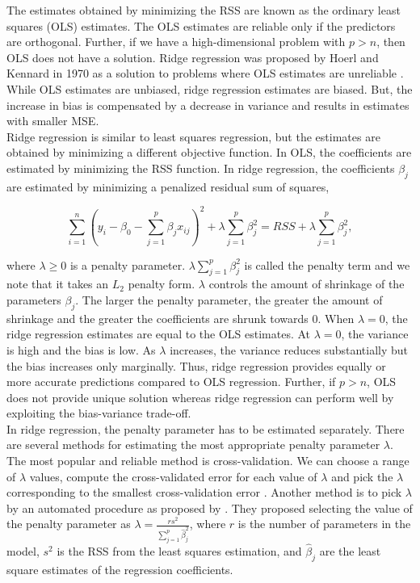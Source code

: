 The estimates obtained by minimizing the RSS are known as the ordinary least squares (OLS) estimates. The OLS estimates are reliable only if the predictors are orthogonal. Further, if we have a high-dimensional problem with $p > n$, then OLS does not have a solution. Ridge regression was proposed by Hoerl and Kennard in 1970 as a solution to problems where OLS estimates are unreliable \cite{hoerl_ridge_1970}. While OLS estimates are unbiased, ridge regression estimates are biased. But, the increase in bias is compensated by a decrease in variance and results in estimates with smaller MSE. \\

Ridge regression is similar to least squares regression, but the estimates are obtained by minimizing a different objective function. In OLS, the coefficients are estimated by minimizing the RSS function. In ridge regression, the coefficients $\beta_j$ are estimated by minimizing a penalized residual sum of squares, 

\begin{equation}
\sum_{i = 1}^n \left( y_i - \beta_0 - \sum_{j = 1}^p \beta_j x_{ij} \right)^2 + \lambda \sum_{j = 1}^p \beta_j^2 = RSS +  \lambda \sum_{j = 1}^p \beta_j^2,
\end{equation}

\noindent where $\lambda\geq 0$ is a penalty parameter. $\lambda\sum_{j =1}^p \beta_j^2$ is called the penalty term and we note that it takes an $L_2$ penalty form. $\lambda$ controls the amount of shrinkage of the parameters $\beta_j$. The larger the penalty parameter, the greater the amount of shrinkage and the greater the coefficients are shrunk towards 0. When $\lambda=0$, the ridge regression estimates are equal to the OLS estimates. At $\lambda = 0$, the variance is high and the bias is low. As $\lambda$ increases, the variance reduces substantially but the bias increases only marginally. Thus, ridge regression provides equally or more accurate predictions compared to OLS regression. Further, if $p>n$, OLS does not provide unique solution whereas ridge regression can perform well by exploiting the bias-variance trade-off. \\

In ridge regression, the penalty parameter has to be estimated separately. There are several methods for estimating the most appropriate penalty parameter $\lambda$. The most popular and reliable method is cross-validation. We can choose a range of $\lambda$ values, compute the cross-validated error for each value of $\lambda$ and pick the $\lambda$ corresponding to the smallest cross-validation error \cite{james_introduction_2013}. Another method is to pick $\lambda$ by an automated procedure as proposed by \cite{hoerl_ridge_1975}. They proposed selecting the value of the penalty parameter as $\lambda = \frac{rs^2}{\sum_{j = 1}^p \hat{\beta}_j^2}$, where $r$ is the number of parameters in the model, $s^2$ is the RSS from the least squares estimation, and $\hat{\beta}_j$ are the least square estimates of the regression coefficients. \\
 

